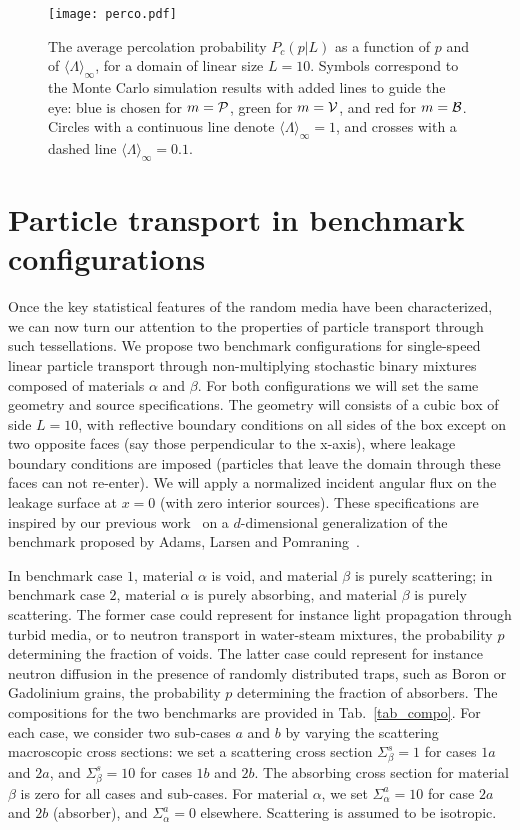 \documentclass[final,authoryear,5p,times,twocolumn]{elsarticle}
\begin{document}
\begin{figure}[t]
\begin{center}
\texttt{[image: perco.pdf]}
\end{center}
\caption{The average percolation probability $P_c(p|L)$ as a function of $p$ and of ${\langle \Lambda \rangle}_{\infty}$, for a domain of linear size $L=10$. Symbols correspond to the Monte Carlo simulation results with added lines to guide the eye: blue is chosen for $m={\cal P}$, green for $m={\cal V}$, and red for $m={\cal B}$. Circles with a continuous line denote ${\langle \Lambda \rangle}_{\infty}=1$, and crosses with a dashed line ${\langle \Lambda \rangle}_{\infty}=0.1$.}
\label{perco}
\end{figure}

\section{Particle transport in benchmark configurations}
\label{transport_benchmark}

Once the key statistical features of the random media have been characterized, we can now turn our attention to the properties of particle transport through such tessellations. We propose two benchmark configurations for single-speed linear particle transport through non-multiplying stochastic binary mixtures composed of materials $\alpha$ and $\beta$. For both configurations we will set the same geometry and source specifications. The geometry will consists of a cubic box of side $L = 10$, with reflective boundary conditions on all sides of the box except on two opposite faces (say those perpendicular to the x-axis), where leakage boundary conditions are imposed (particles that leave the domain through these faces can not re-enter). We will apply a normalized incident angular flux on the leakage surface at $x = 0$ (with zero interior sources). These specifications are inspired by our previous work~\cite{larmier_benchmark} on a $d$-dimensional generalization of the benchmark proposed by Adams, Larsen and Pomraning~\cite{benchmark_adams}.

In benchmark case $1$, material $\alpha$ is void, and material $\beta$ is purely scattering; in benchmark case $2$, material $\alpha$ is purely absorbing, and material $\beta$ is purely scattering. The former case could represent for instance light propagation through turbid media, or to neutron transport in water-steam mixtures, the probability $p$ determining the fraction of voids. The latter case could represent for instance neutron diffusion in the presence of randomly distributed traps, such as Boron or Gadolinium grains, the probability $p$ determining the fraction of absorbers. The compositions for the two benchmarks are provided in Tab.~\ref{tab_compo}. For each case, we consider two sub-cases $a$ and $b$ by varying the scattering macroscopic cross sections: we set a scattering cross section $\Sigma_{\beta}^s=1$ for cases $1a$ and $2a$, and $\Sigma_{\beta}^s=10$ for cases $1b$ and $2b$. The absorbing cross section for material $\beta$ is zero for all cases and sub-cases. For material $\alpha$, we set $\Sigma_{\alpha}^a=10$ for case $2a$ and $2b$ (absorber), and $\Sigma_{\alpha}^a=0$ elsewhere. Scattering is assumed to be isotropic.
\end{document}
